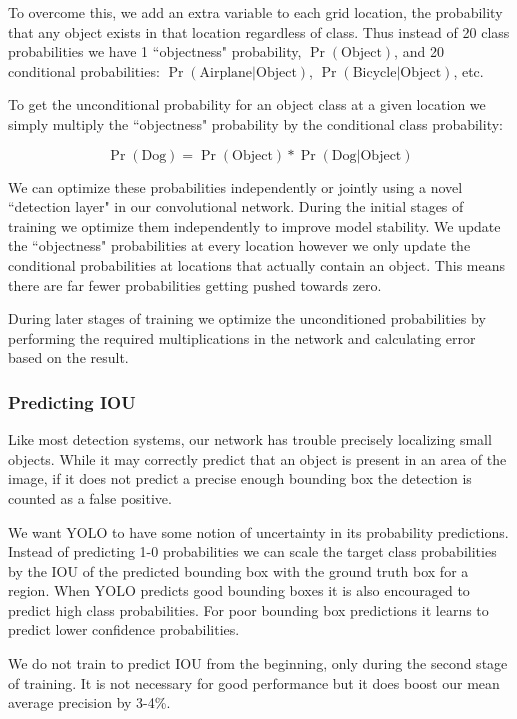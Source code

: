 \documentclass{article} %
\begin{document}
To overcome this, we add an extra variable to each grid location, the probability that any object exists in that location regardless of class. Thus instead of 20 class probabilities we have 1 ``objectness" probability, $\Pr(\textrm{Object})$, and 20 conditional probabilities: $\Pr(\textrm{Airplane} | \textrm{Object})$, $\Pr(\textrm{Bicycle} | \textrm{Object})$, etc.

To get the unconditional probability for an object class at a given location we simply multiply the ``objectness" probability by the conditional class probability:

\begin{equation}
\Pr(\textrm{Dog}) = \Pr(\textrm{Object}) * \Pr(\textrm{Dog} | \textrm{Object})
\end{equation}

We can optimize these probabilities independently or jointly using a novel ``detection layer" in our convolutional network. During the initial stages of training we optimize them independently to improve model stability. We update the ``objectness" probabilities at every location however we only update the conditional probabilities at locations that actually contain an object. This means there are far fewer probabilities getting pushed towards zero. 

During later stages of training we optimize the unconditioned probabilities by performing the required multiplications in the network and calculating error based on the result.

\subsubsection{Predicting IOU}

Like most detection systems, our network has trouble precisely localizing small objects. While it may correctly predict that an object is present in an area of the image, if it does not predict a precise enough bounding box the detection is counted as a false positive.

We want YOLO to have some notion of uncertainty in its probability predictions. Instead of predicting 1-0 probabilities we can scale the target class probabilities by the IOU of the predicted bounding box with the ground truth box for a region. When YOLO predicts good bounding boxes it is also encouraged to predict high class probabilities. For poor bounding box predictions it learns to predict lower confidence probabilities.

We do not train to predict IOU from the beginning, only during the second stage of training. It is not necessary for good performance but it does boost our mean average precision by 3-4\%.
\end{document}
